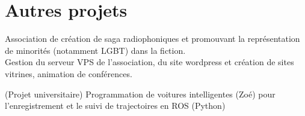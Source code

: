 \documentclass[]{cv-template}
\begin{document}
\begin{minipage}[t]{0.65\textwidth}




\section{Autres projets}
Association de création de saga radiophoniques et promouvant la représentation de minorités (notamment LGBT) dans la fiction.\\
Gestion du serveur VPS de l'association, du site wordpress et création de sites vitrines, animation de conférences.

(Projet universitaire) Programmation de voitures intelligentes (Zoé) pour l'enregistrement et le suivi de trajectoires en ROS (Python)


\end{minipage}
\end{document}
